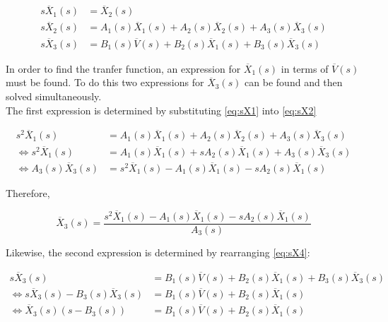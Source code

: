 \documentclass[a4paper,10pt,reqno]{amsart}
\numberwithin{equation}{section}
\begin{document}
\setlength{\jot}{5pt} %

\begin{subequations} \label{eq:SysLT}
    \begin{align}
         s\overline{X}_1(s) &= \overline{X}_2(s) \label{eq:sX1} \\
         s\overline{X}_2(s) &= A_1(s)\overline{X}_1(s) + A_2(s)\overline{X}_2(s) + A_3(s)\overline{X}_3(s) \label{eq:sX2} \\
         s\overline{X}_3(s) &= B_1(s)\overline{V}(s) + B_2(s)\overline{X}_1(s) + B_3(s)\overline{X}_3(s) \label{eq:sX4}
    \end{align}
\end{subequations}
\vspace{1pt}

In order to find the tranfer function, an expression for $\overline{X}_1(s)$ in terms of $\overline{V}(s)$ must be found. To do this two expressions for $\overline{X}_3(s)$ can be found and then solved simultaneously.\\
The first expression is determined by substituting \ref{eq:sX1} into \ref{eq:sX2}

\begin{align*}
     s^2\overline{X}_1(s) &= A_1(s)\overline{X}_1(s) + A_2(s)\overline{X}_2(s) + A_3(s)\overline{X}_3(s) \\
     \iff s^2\overline{X}_1(s) &= A_1(s)\overline{X}_1(s) + sA_2(s)\overline{X}_1(s) + A_3(s)\overline{X}_3(s) \\
     \iff A_3(s)\overline{X}_3(s) &= s^2\overline{X}_1(s) - A_1(s)\overline{X}_1(s) - sA_2(s)\overline{X}_1(s)
\end{align*}
\vspace{1pt}

Therefore,

\begin{equation}
     \overline{X}_3(s) =\frac{s^2\overline{X}_1(s) - A_1(s)\overline{X}_1(s) - sA_2(s)\overline{X}_1(s)}{A_3(s)} \label{eq:X3_1}
\end{equation}
\vspace{1pt}

Likewise, the second expression is determined by rearranging \ref{eq:sX4}:

\begin{align*}
     s\overline{X}_3(s) &= B_1(s)\overline{V}(s) + B_2(s)\overline{X}_1(s) + B_3(s)\overline{X}_3(s) \\
     \iff s\overline{X}_3(s) - B_3(s)\overline{X}_3(s) &= B_1(s)\overline{V}(s) + B_2(s)\overline{X}_1(s) \\
     \iff \overline{X}_3(s)\left(s - B_3(s)\right) &= B_1(s)\overline{V}(s) + B_2(s)\overline{X}_1(s)
\end{align*}
\vspace{1pt}
\end{document}
